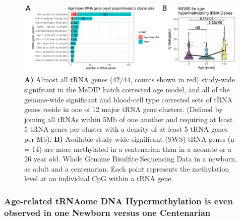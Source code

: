\documentclass[
]{book}
\begin{document}
\begin{figure}

{\centering \includegraphics[width=0.95\linewidth]{./figs/heyn-cluster} 

}

\caption{\textbf{A)} Almost all tRNA genes (42/44, counts shown in red) study-wide significant in the MeDIP batch corrected age model, and all of the genome-wide significant and blood-cell type corrected sets of tRNA genes reside in one of 12 major tRNA gene clusters. (Defined by joining all tRNAs within 5Mb of one another and requiring at least 5 tRNA genes per cluster with a density of at least 5 tRNA genes per Mb). \textbf{B)} Available study-wide significant (SWS) tRNA genes (n = 14) are more methylated in a centenarian than in a neonate or a 26 year old. Whole Genome Bisulfite Sequencing Data in a newborn, as adult and a centenarian. Each point represents the methylation level at an individual CpG within a tRNA gene.}\label{fig:heyn}
\end{figure}



\hypertarget{age-related-trnaome-dna-hypermethylation-is-even-observed-in-one-newborn-versus-one-centenarian}{%
\subsubsection{Age-related tRNAome DNA Hypermethylation is even observed in one Newborn versus one Centenarian}\label{age-related-trnaome-dna-hypermethylation-is-even-observed-in-one-newborn-versus-one-centenarian}}
\end{document}
